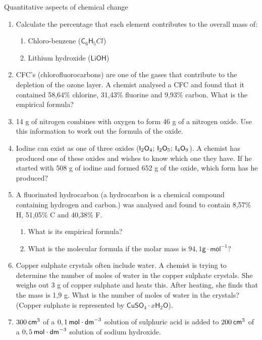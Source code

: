 \begin{eocexercises}{Quantitative aspects of chemical change}
\begin{enumerate}[noitemsep, label=\textbf{\arabic*}. ]
\item Calculate the percentage that each element contributes to the overall mass of:
\label{m38712*id6334}\begin{enumerate}[noitemsep, label=\textbf{\alph*}. ] 
            \item Chloro-benzene (${\mathsf{C}}_{6}{\mathsf{H}}_{5}Cl$)\item Lithium hydroxide ($\mathsf{LiOH}$)\end{enumerate}
\item CFC's (chlorofluorocarbons) are one of the gases that contribute to the depletion of the ozone layer. A chemist analysed a CFC and found that it contained 58,64\% chlorine, 31,43\% fluorine and 9,93\% carbon. What is the empirical formula?\newline
\item 14 g of nitrogen combines with oxygen to form 46 g of a nitrogen oxide. Use this information to work out the formula of the oxide.\newline
            \item Iodine can exist as one of three oxides (${\mathsf{I}}_{2}{\mathsf{O}}_{4};\phantom{\rule{2pt}{0ex}}{\mathsf{I}}_{2}{\mathsf{O}}_{5};\phantom{\rule{2pt}{0ex}}{\mathsf{I}}_{4}{\mathsf{O}}_{9}$). A chemist has produced one of these oxides and wishes to know which one they have. If he started with 508 g of iodine and formed 652 g of the oxide, which form has he produced?\newline
            \item A fluorinated hydrocarbon (a hydrocarbon is a chemical compound containing hydrogen and carbon.) was analysed and found to contain 8,57\% H, 51,05\% C and 40,38\% F.\label{m38712*id73222}\begin{enumerate}[noitemsep, label=\textbf{\alph*}. ] 
            \item What is its empirical formula?\item What is the molecular formula if the molar mass is $94,1\mathsf{g}\cdot {\mathsf{mol}}^{-1}$?\end{enumerate}
                \item Copper sulphate crystals often include water. A chemist is trying to determine the number of moles of water in the copper sulphate crystals. She weighs out 3 g of copper sulphate and heats this. After heating, she finds that the mass is 1,9 g. What is the number of moles of water in the crystals? (Copper sulphate is represented by ${\mathsf{CuSO}}_{4}\cdot x{\mathsf{H}}_{2}\mathsf{O}$).        \label{m38712*uid147}\item $300\phantom{\rule{2pt}{0ex}}{\mathsf{cm}}^{3}$ of a $0,1\phantom{\rule{2pt}{0ex}}\mathsf{mol}\ensuremath{\cdot}{\mathsf{dm}}^{-3}$ solution of sulphuric acid is added to $200\phantom{\rule{2pt}{0ex}}{\mathsf{cm}}^{3}$ of a $0,5\phantom{\rule{2pt}{0ex}}\mathsf{mol}\ensuremath{\cdot}{\mathsf{dm}}^{-3}$ solution of sodium hydroxide.

\end{enumerate}
\end{eocexercises}
